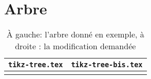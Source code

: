 \documentclass[a4paper]{article}
\begin{document}
\section{Arbre}

\begin{table}[!htbp]
  \centering
  \begin{tabular}{cc}
    \texttt{tikz-tree.tex}&
    \texttt{tikz-tree-bis.tex}\\
    \hline
    &
     
  \end{tabular}
  \caption{
    \`A gauche: l'arbre donné en exemple, à droite : la modification
    demandée
  }
  \label{tab:tikz-tree}
\end{table}
\end{document}

